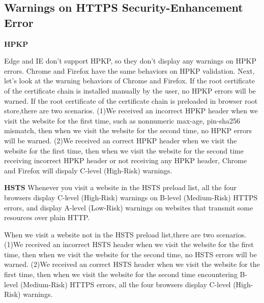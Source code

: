 \subsection{Warnings on HTTPS Security-Enhancement Error}
\textbf{HPKP}

    Edge and IE don't support HPKP, so they don't display any warnings on HPKP errors.
    Chrome and Firefox have the same behaviors on HPKP validation.
    Next, let's look at the warning behaviors of Chrome and Firefox.
    If the root certificate of the certificate chain is installed manually by the user, no HPKP errors will be warned.
    If the root certificate of the certificate chain is preloaded in browser root store,there are two scenarios.
        (1)We received an incorrect HPKP header when we visit the website for the first time, such as nonnumeric max-age, pin-sha256 mismatch, 
        then when we visit the website for the second time, no HPKP errors will be warned.
        (2)We received an correct HPKP header when we visit the website for the first time,
        then when we visit the website for the second time receiving incorrect HPKP header or not receiving any HPKP header, Chrome and Firefox will
        dispaly C-level (High-Risk) warnings.
               
 \textbf{HSTS}    
    Whenever you visit a website in the HSTS preload list, 
        all the four browsers display C-level (High-Risk) warnings on B-level (Medium-Risk) HTTPS errors,
            and display A-level (Low-Risk) warnings on websites that transmit some resources over plain HTTP.
   
    When we visit a website not in the HSTS preload list,there are two scenarios.
        (1)We received an incorrect HSTS header when we visit the website for the first time,
        then when we visit the website for the second time, no HSTS errors will be warned.     
        (2)We received an correct HSTS header when we visit the website for the first time,
        then when we visit the website for the second time encountering B-level (Medium-Risk) HTTPS errors,
        all the four browsers display C-level (High-Risk) warnings.
        

